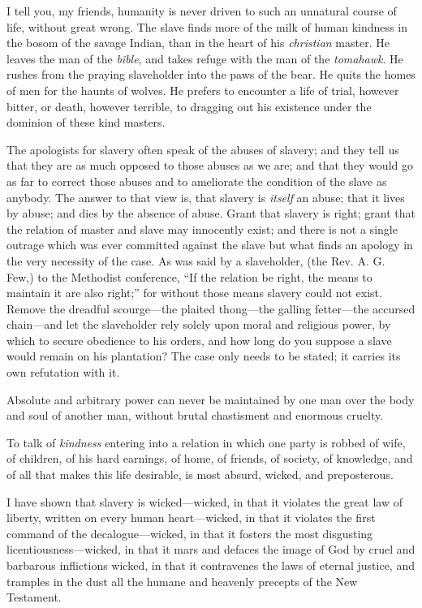 I tell you, my friends, humanity is never driven to such an unnatural
course of life, without great wrong. The slave finds more of the milk of
human kindness in the bosom of the savage Indian, than in the heart of
his \emph{christian} master. He leaves the man of the \emph{bible}, and
takes refuge with the man of the \emph{tomahawk}. He rushes from the
praying slaveholder into the paws of the bear. He quits the homes of men
for the haunts of wolves. He prefers to encounter a life of trial,
however bitter, or death, however terrible, to dragging out his
existence under the dominion of these kind masters.

The apologists for slavery often speak of the abuses of slavery; and
they tell us that they are as much opposed to those abuses as we are;
and that they would go as far to correct those abuses and to ameliorate
the condition of the slave as anybody. The answer to that view is, that
slavery is \emph{itself} an abuse; that it lives by abuse; and dies by
the absence of abuse. Grant that slavery is right; grant that the
relation of master and slave may innocently exist; and there is not a
single outrage which was ever committed against the slave but what finds
an apology in the very necessity of the case. As was said by a
slaveholder, (the Rev. A. G. Few,) to the Methodist conference, ``If the
relation be right, the means to maintain it are also right;'' for
without those means slavery could not exist. Remove the dreadful
scourge---the plaited thong---the galling fetter---the accursed
chain---and let the slaveholder rely solely upon moral and religious
power, by which to secure obedience to his orders, and how long do you
suppose a slave would remain on his plantation? The case only needs to
be stated; it carries its own refutation with it.

Absolute and arbitrary power can never be maintained by one man over the
body and soul of another man, without brutal chastisment and enormous
cruelty.

To talk of \emph{kindness} entering into a relation in which one party
is robbed of wife, of children, of his hard earnings, of home, of
friends, of society, of knowledge, and of all that makes this life
desirable, is most absurd, wicked, and preposterous.

I have shown that slavery is wicked---wicked, in that it violates
{\protect\hypertarget{437}{}{}}the great law of liberty, written on
every human heart---wicked, in that it violates the first command of the
decalogue---wicked, in that it fosters the most disgusting
licentiousness---wicked, in that it mars and defaces the image of God by
cruel and barbarous inflictions wicked, in that it contravenes the laws
of eternal justice, and tramples in the dust all the humane and heavenly
precepts of the New Testament.


